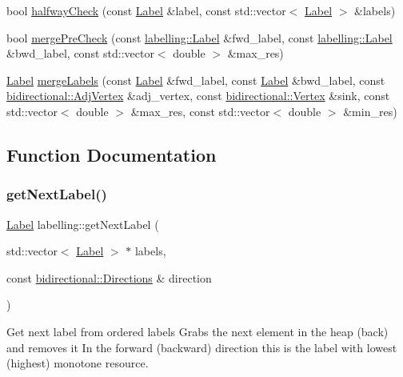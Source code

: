 \begin{DoxyCompactItemize}
\item 
bool \hyperlink{namespacelabelling_ad7fee591bcb066e39ff97138ab0ba5ca}{halfway\+Check} (const \hyperlink{classlabelling_1_1Label}{Label} \&label, const std\+::vector$<$ \hyperlink{classlabelling_1_1Label}{Label} $>$ \&labels)
\item 
bool \hyperlink{namespacelabelling_a9c2e8f16965144d445ba68216dae648f}{merge\+Pre\+Check} (const \hyperlink{classlabelling_1_1Label}{labelling\+::\+Label} \&fwd\+\_\+label, const \hyperlink{classlabelling_1_1Label}{labelling\+::\+Label} \&bwd\+\_\+label, const std\+::vector$<$ double $>$ \&max\+\_\+res)
\item 
\hyperlink{classlabelling_1_1Label}{Label} \hyperlink{namespacelabelling_a19937349c6ec5c31d5994aac45c5d2fd}{merge\+Labels} (const \hyperlink{classlabelling_1_1Label}{Label} \&fwd\+\_\+label, const \hyperlink{classlabelling_1_1Label}{Label} \&bwd\+\_\+label, const \hyperlink{structbidirectional_1_1AdjVertex}{bidirectional\+::\+Adj\+Vertex} \&adj\+\_\+vertex, const \hyperlink{structbidirectional_1_1Vertex}{bidirectional\+::\+Vertex} \&sink, const std\+::vector$<$ double $>$ \&max\+\_\+res, const std\+::vector$<$ double $>$ \&min\+\_\+res)
\end{DoxyCompactItemize}


\subsection{Function Documentation}
\mbox{\label{namespacelabelling_a7d32365acb745f452e0b81beed2ce2be}} 
\subsubsection{\texorpdfstring{get\+Next\+Label()}{getNextLabel()}}
{\footnotesize\ttfamily \hyperlink{classlabelling_1_1Label}{Label} labelling\+::get\+Next\+Label (\begin{DoxyParamCaption}\item[{std\+::vector$<$ \hyperlink{classlabelling_1_1Label}{Label} $>$ $\ast$}]{labels,  }\item[{const \hyperlink{namespacebidirectional_a4cbe6f0bfbd3629c2cd44c98014aed70}{bidirectional\+::\+Directions} \&}]{direction }\end{DoxyParamCaption})}

Get next label from ordered labels Grabs the next element in the heap (back) and removes it In the forward (backward) direction this is the label with lowest (highest) monotone resource.


